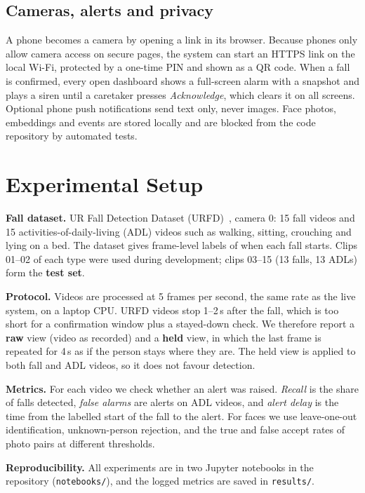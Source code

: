 \documentclass[11pt,a4paper]{article}
\begin{document}
\subsection{Cameras, alerts and privacy}

A phone becomes a camera by opening a link in its browser. Because phones only allow camera access on secure pages,
the system can start an HTTPS link on the local Wi-Fi, protected by a one-time PIN and shown as a QR code. When a fall is
confirmed, every open dashboard shows a full-screen alarm with a snapshot and plays a siren until a caretaker presses
\emph{Acknowledge}, which clears it on all screens. Optional phone push notifications send text only, never images.
Face photos, embeddings and events are stored locally and are blocked from the code repository by automated tests.

\section{Experimental Setup}

\textbf{Fall dataset.} UR Fall Detection Dataset (URFD)~\cite{kwolek2014}, camera 0: 15 fall videos and 15
activities-of-daily-living (ADL) videos such as walking, sitting, crouching and lying on a bed. The dataset gives
frame-level labels of when each fall starts. Clips 01--02 of each type were used during development; clips 03--15
(13 falls, 13 ADLs) form the \textbf{test set}.

\textbf{Protocol.} Videos are processed at 5 frames per second, the same rate as the live system, on a laptop CPU.
URFD videos stop 1--2\,s after the fall, which is too short for a confirmation window plus a stayed-down check. We
therefore report a \textbf{raw} view (video as recorded) and a \textbf{held} view, in which the last frame is repeated
for 4\,s as if the person stays where they are. The held view is applied to both fall and ADL videos, so it does not
favour detection.

\textbf{Metrics.} For each video we check whether an alert was raised. \emph{Recall} is the share of falls detected,
\emph{false alarms} are alerts on ADL videos, and \emph{alert delay} is the time from the labelled start of the fall
to the alert. For faces we use leave-one-out identification, unknown-person rejection, and the true and false accept
rates of photo pairs at different thresholds.

\textbf{Reproducibility.} All experiments are in two Jupyter notebooks in the repository
(\texttt{notebooks/}), and the logged metrics are saved in \texttt{results/}.
\end{document}
